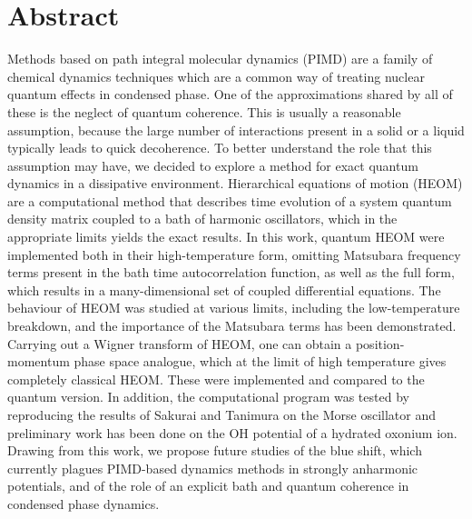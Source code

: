 \chapter*{Abstract}
Methods based on path integral molecular dynamics (PIMD) are a family of chemical dynamics techniques which are a common way of treating nuclear quantum effects in condensed phase. One of the approximations shared by all of these is the neglect of quantum coherence. This is usually a reasonable assumption, because the large number of interactions present in a solid or a liquid typically leads to quick decoherence. To better understand the role that this assumption may have, we decided to explore a method for exact quantum dynamics in a dissipative environment. Hierarchical equations of motion (HEOM) are a computational method that describes time evolution of a system quantum density matrix coupled to a bath of harmonic oscillators, which in the appropriate limits yields the exact results. In this work, quantum HEOM were implemented both in their high-temperature form, omitting Matsubara frequency terms present in the bath time autocorrelation function, as well as the full form, which results in a many-dimensional set of coupled differential equations. The behaviour of HEOM was studied at various limits, including the low-temperature breakdown, and the importance of the Matsubara terms has been demonstrated. Carrying out a Wigner transform of HEOM, one can obtain a position-momentum phase space analogue, which at the limit of high temperature gives completely classical HEOM. These were implemented and compared to the quantum version. In addition, the computational program was tested by reproducing the results of Sakurai and Tanimura on the Morse oscillator and preliminary work has been done on the OH potential of a hydrated oxonium ion. Drawing from this work, we propose future studies of the blue shift, which currently plagues PIMD-based dynamics methods in strongly anharmonic potentials, and of the role of an explicit bath and quantum coherence in condensed phase dynamics.